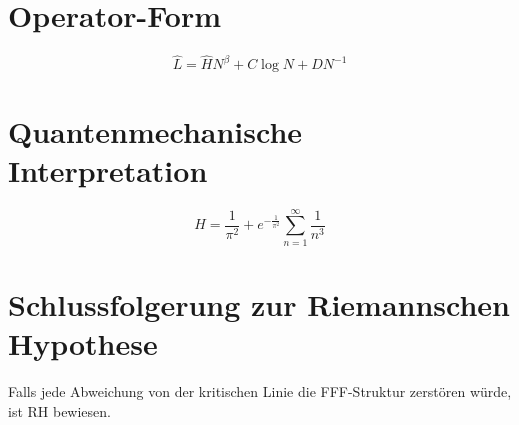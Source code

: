 \documentclass[a4paper,12pt]{article}
\begin{document}
\section{Operator-Form}
\[
\hat{L} = \hat{H} N^\beta + C \log N + D N^{-1}
\]

\section{Quantenmechanische Interpretation}
\[
\hat{H} = \frac{1}{\pi^2} + e^{-\frac{1}{\pi^2}} \sum_{n=1}^{\infty} \frac{1}{n^3}
\]

\section{Schlussfolgerung zur Riemannschen Hypothese}
Falls jede Abweichung von der kritischen Linie die FFF-Struktur zerstören würde, ist RH bewiesen.
\end{document}
